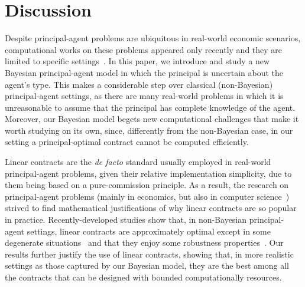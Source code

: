 \section{Discussion}\label{sec:conclusions}


Despite principal-agent problems are ubiquitous in real-world economic scenarios, computational works on these problems appeared only recently and they are limited to specific settings~\citep{babaioff2012combinatorial,dutting2019simple,dutting2020complexity}.
%
In this paper, we introduce and study a new Bayesian principal-agent model in which the principal is uncertain about the agent's type.
%
This makes a considerable step over classical (non-Bayesian) principal-agent settings, as there are many real-world problems in which it is unreasonable to assume that the principal has complete knowledge of the agent.
%
Moreover, our Bayesian model begets new computational challenges that make it worth studying on its own, since, differently from the non-Bayesian case, in our setting a principal-optimal contract cannot be computed efficiently.


Linear contracts are the \emph{de facto} standard usually employed in real-world principal-agent problems, given their relative implementation simplicity, due to them being based on a pure-commission principle.
%
As a result, the research on principal-agent problems (mainly in economics, but also in computer science~\citep{dutting2019simple}) strived to find mathematical justifications of why linear contracts are so popular in practice.
%
Recently-developed studies show that, in non-Bayesian principal-agent settings, linear contracts are approximately optimal except in some degenerate situations~\citep{dutting2019simple} and that they enjoy some robustness properties~\citep{carroll2015robustness,carroll2019robustness,dutting2019simple}.
%
Our results further justify the use of linear contracts, showing that, in more realistic settings as those captured by our Bayesian model, they are the best among all the contracts that can be designed with bounded computationally resources.